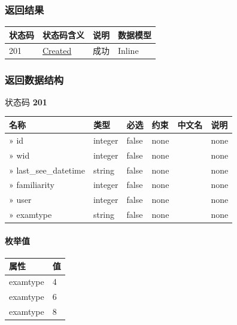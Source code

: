 \documentclass[
]{article}
\begin{document}
\hypertarget{ux8fd4ux56deux7ed3ux679c-17}{%
\subsubsection{返回结果}\label{ux8fd4ux56deux7ed3ux679c-17}}

\begin{longtable}[]{@{}llll@{}}
\toprule
状态码 & 状态码含义 & 说明 & 数据模型 \\
\midrule
\endhead
201 & \href{https://tools.ietf.org/html/rfc7231\#section-6.3.2}{Created}
& 成功 & Inline \\
\bottomrule
\end{longtable}

\hypertarget{ux8fd4ux56deux6570ux636eux7ed3ux6784-13}{%
\subsubsection{返回数据结构}\label{ux8fd4ux56deux6570ux636eux7ed3ux6784-13}}

状态码 \textbf{201}

\begin{longtable}[]{@{}llllll@{}}
\toprule
名称 & 类型 & 必选 & 约束 & 中文名 & 说明 \\
\midrule
\endhead
» id & integer & false & none & & none \\
» wid & integer & false & none & & none \\
» last\_see\_datetime & string & false & none & & none \\
» familiarity & integer & false & none & & none \\
» user & integer & false & none & & none \\
» examtype & string & false & none & & none \\
\bottomrule
\end{longtable}

\hypertarget{ux679aux4e3eux503c-5}{%
\paragraph{枚举值}\label{ux679aux4e3eux503c-5}}

\begin{longtable}[]{@{}ll@{}}
\toprule
属性 & 值 \\
\midrule
\endhead
examtype & 4 \\
examtype & 6 \\
examtype & 8 \\
\bottomrule
\end{longtable}
\end{document}
